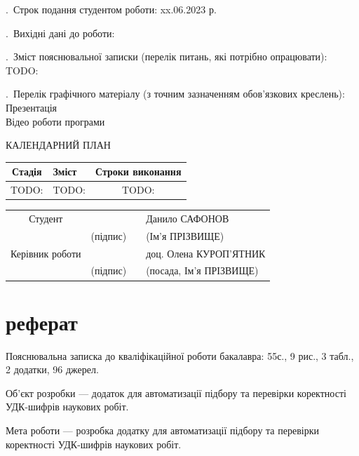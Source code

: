 \documentclass[14pt]{extarticle}
\let\oldsection\section
\renewcommand{\section}{\clearpage\oldsection}
\begin{document}
. Строк подання студентом роботи:
xx.06.2023 р.

. Вихідні дані до роботи:

. Зміст пояснювальної записки (перелік питань, які потрібно опрацювати):\\
TODO:

. Перелік графічного матеріалу (з точним зазначенням обов’язкових креслень):\\
Презентація\\
Відео роботи програми\\

\newpage
\centerline{КАЛЕНДАРНИЙ ПЛАН}
\vspace{\baselineskip}

\noindent
\begin{tabularx}{\linewidth}{|c|X|c|}
  \hline
  Стадія & Зміст & Строки виконання \\
  \hline
  TODO:  & TODO: & TODO: \\
  \hline
\end{tabularx}

\vspace{\baselineskip}
\begin{flushright}
\begin{tabular}{clp{0.7cm}l}
  Студент         &                                      & & Данило САФОНОВ \\ \cline{2-2} \cline{4-4}
                  & \fontsize{10}{10}\selectfont(підпис) & & \fontsize{10}{10}\selectfont(Ім’я ПРІЗВИЩЕ) \\
  Керівник роботи &                                      & & доц. Олена КУРОП'ЯТНИК \\ \cline{2-2} \cline{4-4}
                  & \fontsize{10}{10}\selectfont(підпис) & & \fontsize{10}{10}\selectfont(посада, Ім’я ПРІЗВИЩЕ)\\
\end{tabular}
\end{flushright}

\section*{реферат}
Пояснювальна записка до кваліфікаційної роботи бакалавра:
55с., 9 рис., 3 табл., 2 додатки, 96 джерел.

Об’єкт розробки --- додаток для автоматизації підбору
та перевірки коректності УДК-шифрів наукових робіт.

Мета роботи --- розробка додатку для автоматизації підбору
та перевірки коректності УДК-шифрів наукових робіт.
\end{document}
